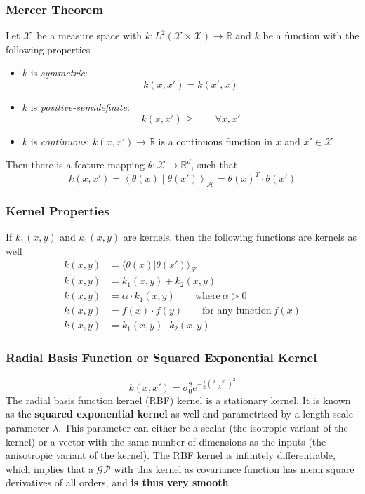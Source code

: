 \documentclass[11pt]{article}
\theoremstyle{definition}
\newcommand*\R{\mathbb{R}}
\newcommand*\X{\ensuremath{\mathcal{X}}}
\newcommand*\Hilbert{\ensuremath{\mathcal{H}}}
\begin{document}
\subsubsection{Mercer Theorem}
Let \X\ be a measure space with $k:L^2(\X\times\X)\rightarrow \R$ and $k$ be a function with the following properties
\begin{itemize}
	\item $k$ is \emph{symmetric}:
	\begin{equation*}
		k(x,x') = k(x',x)
	\end{equation*}
	\item $k$ is \emph{positive-semidefinite}:
	\begin{equation*}
		k(x,x') \geq\qquad \forall x,x'
	\end{equation*}
	\item $k$ is \emph{continuous}: $k(x,x') \rightarrow \R$ is a continuous function in $x$ and $x' \in \X$ 
\end{itemize}
Then there is a feature mapping $\theta : \X \rightarrow \R^d$, such that
\begin{equation*}
	k(x,x') = \left\langle \theta(x) \middle| \theta(x') \right\rangle_\Hilbert = \theta(x)^T \cdot \theta(x')
\end{equation*}

\subsubsection{Kernel Properties}
If $k_1(x,y)$ and $k_1(x,y)$ are kernels, then the following functions are kernels as well
\begin{align*}
	k(x,y) &= \langle\theta(x) | \theta(x')\rangle_{\mathcal{F}}\\
	k(x,y) &= k_1(x,y) + k_2(x,y)\\
	k(x,y) &= \alpha\cdot k_1(x,y)\qquad\text{where}\ \alpha>0\\
	k(x,y) &= f(x) \cdot f(y)\qquad\text{for any function}\ f(x)\\
	k(x,y) &= k_1(x,y) \cdot k_2(x,y)
\end{align*}

\subsubsection{Radial Basis Function or Squared Exponential Kernel}
\begin{equation*}
	k(x,x') = \sigma_0^2 e^{-\frac{1}{2}\left(\frac{x-x'}{\lambda}\right)^2}
\end{equation*}
The radial basis function kernel (RBF) kernel is a stationary kernel. It is known as the \textbf{squared exponential kernel} as well and parametrised by a length-scale parameter $\lambda$. This parameter can either be a scalar (the isotropic variant of the kernel) or a vector with the same number of dimensions as the inputs (the anisotropic variant of the kernel). The RBF kernel is infinitely differentiable, which implies that a $\mathcal{GP}$ with this kernel as covariance function has mean square derivatives of all orders, and \textbf{is thus very smooth}.
\end{document}
